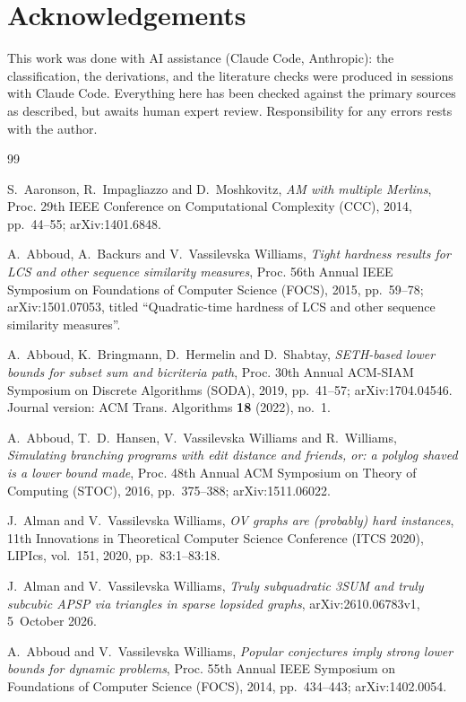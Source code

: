 \documentclass[10pt]{amsart}
\theoremstyle{plain}
\theoremstyle{definition}
\theoremstyle{remark}
\numberwithin{equation}{section}
\begin{document}
\section*{Acknowledgements}
This work was done with AI assistance (Claude Code, Anthropic): the classification, the
derivations, and the literature checks were produced in sessions with Claude Code. Everything here
has been checked against the primary sources as described, but awaits human expert review.
Responsibility for any errors rests with the author.

\begin{thebibliography}{99}

S.~Aaronson, R.~Impagliazzo and D.~Moshkovitz, \emph{{AM} with multiple {M}erlins}, Proc. 29th IEEE
Conference on Computational Complexity (CCC), 2014, pp.~44--55; arXiv:1401.6848.

A.~Abboud, A.~Backurs and V.~Vassilevska Williams, \emph{Tight hardness results for {LCS} and other
sequence similarity measures}, Proc. 56th Annual IEEE Symposium on Foundations of Computer Science
(FOCS), 2015, pp.~59--78; arXiv:1501.07053, titled ``Quadratic-time hardness of {LCS} and other
sequence similarity measures''.

A.~Abboud, K.~Bringmann, D.~Hermelin and D.~Shabtay, \emph{{SETH}-based lower bounds for subset sum
and bicriteria path}, Proc. 30th Annual ACM-SIAM Symposium on Discrete Algorithms (SODA), 2019,
pp.~41--57; arXiv:1704.04546. Journal version: ACM Trans. Algorithms \textbf{18} (2022), no.~1.

A.~Abboud, T.~D.~Hansen, V.~Vassilevska Williams and R.~Williams, \emph{Simulating branching
programs with edit distance and friends, or: a polylog shaved is a lower bound made}, Proc. 48th
Annual ACM Symposium on Theory of Computing (STOC), 2016, pp.~375--388; arXiv:1511.06022.

J.~Alman and V.~Vassilevska Williams, \emph{{OV} graphs are (probably) hard instances}, 11th
Innovations in Theoretical Computer Science Conference (ITCS 2020), LIPIcs, vol.~151, 2020,
pp.~83:1--83:18.

J.~Alman and V.~Vassilevska Williams, \emph{Truly subquadratic {3SUM} and truly subcubic {APSP} via
triangles in sparse lopsided graphs}, arXiv:2610.06783v1, 5~October 2026.

A.~Abboud and V.~Vassilevska Williams, \emph{Popular conjectures imply strong lower bounds for
dynamic problems}, Proc. 55th Annual IEEE Symposium on Foundations of Computer Science (FOCS), 2014,
pp.~434--443; arXiv:1402.0054.


\end{thebibliography}
\end{document}
